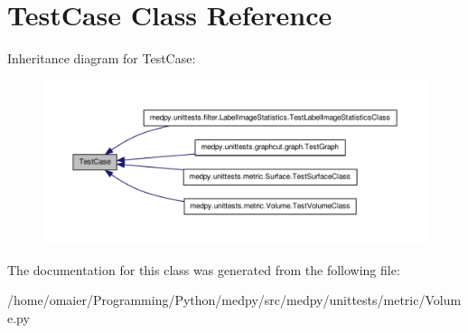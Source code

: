 \hypertarget{classunittest_1_1TestCase}{
\section{TestCase Class Reference}
\label{classunittest_1_1TestCase}
}


Inheritance diagram for TestCase:\nopagebreak
\begin{figure}[H]
\begin{center}
\leavevmode
\includegraphics[width=400pt]{classunittest_1_1TestCase__inherit__graph}
\end{center}
\end{figure}


The documentation for this class was generated from the following file:\begin{DoxyCompactItemize}
\item 
/home/omaier/Programming/Python/medpy/src/medpy/unittests/metric/Volume.py\end{DoxyCompactItemize}
